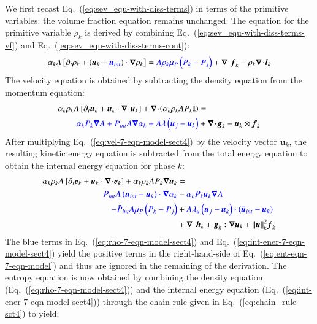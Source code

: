 \documentclass[preprint,10pt]{elsarticle}
\renewcommand{\div}{\mbold{\nabla}\! \cdot \!}
\newcommand{\grad}{\mbold{\nabla}}
\newcommand{\mbold}[1]{\boldsymbol#1}
\newcommand{\eqt}[1]{Eq.~(\ref{#1})}                     %
\begin{document}
%
We first recast \eqt{eq:sev_equ-with-diss-terms} in terms of the primitive variables: the volume fraction equation remains unchanged. The equation for the primitive variable $\rho_k$ is derived by combining \eqt{eq:sev_equ-with-diss-terms-vf} and \eqt{eq:sev_equ-with-diss-terms-cont}:
%
\begin{equation}\label{eq:rho-7-eqn-model-sect4}
\alpha_k A \left[ \partial_t \rho_k + \left( \mbold u_k - \textcolor{blue}{\mbold u_{int}} \right) \cdot \grad \rho_k \right] = \textcolor{blue}{A \rho_k \mu_P \left( P_k - P_j \right)} + \div \mbold f_k - \rho_k \div \mbold l_k
\end{equation}
%
The velocity equation is obtained by subtracting the density equation from the momentum equation:
%
\begin{align}\label{eq:vel-7-eqn-model-sect4}
\alpha_k \rho_k  A \left[ \partial_t \mbold u_k + \mbold u_k \cdot \div \mbold u_k \right]  + \div \left( \alpha_k \rho_k A P_k \mathbb{I} \right) &=\nonumber\\
\textcolor{blue}{\alpha_k P_k \grad A + P_{int} A \grad \alpha_k + A \lambda \left( \mbold u_j - \mbold u_k \right)} &+ \div \mbold g_k - \mbold u_k \otimes \mbold f_k
\end{align}
%
After multiplying \eqt{eq:vel-7-eqn-model-sect4} by the velocity vector $\mbold u_k$, the resulting kinetic energy equation is subtracted from the total energy equation to obtain the internal energy equation for phase $k$:
%
\begin{align}\label{eq:int-ener-7-eqn-model-sect4}
\alpha_k \rho_k  A \left[ \partial_t \mbold e_k + \mbold u_k \cdot \div \mbold e_k \right]  + \alpha_k \rho_k A P_k \grad \mbold u_k &=\nonumber\\
\textcolor{blue}{P_{int} A \left(\mbold u_{int}-\mbold u_k \right) \cdot \grad \alpha_k} &-  \textcolor{blue}{\alpha_k P_k \mbold u_k \grad A} \nonumber \\ 
\textcolor{blue}{-\bar{P}_{int} A \mu_P \left(P_k-P_j \right)} &+ \textcolor{blue}{A \lambda_u \left(\mbold u_j-\mbold u_k  \right) \cdot \left(\bar{\mbold u}_{int}- \mbold u_k \right)}\nonumber \\
&+ \div \mbold h_k + \mbold g_k : \grad \mbold u_k + || \mbold u ||^2_k \mbold f_k
\end{align}
%
The blue terms in \eqt{eq:rho-7-eqn-model-sect4} and \eqt{eq:int-ener-7-eqn-model-sect4} yield the positive terms in the right-hand-side of \eqt{eq:ent-eqn-7-eqn-model} and thus are ignored in the remaining of the derivation. The entropy equation is now obtained by combining the density equation (\eqt{eq:rho-7-eqn-model-sect4}) and the internal energy equation (\eqt{eq:int-ener-7-eqn-model-sect4}) through the chain rule given in \eqt{eq:chain_rule-sct4} to yield:
\end{document}

